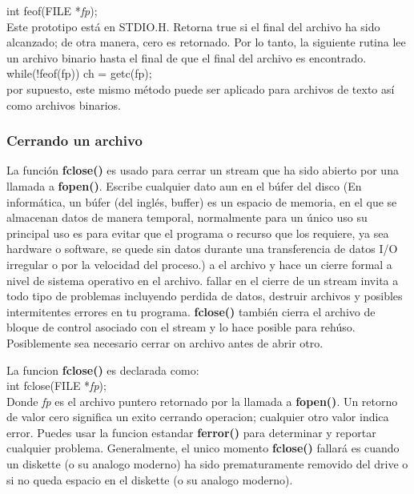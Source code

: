 \documentclass[]{article}
\begin{document}
	int feof(FILE *\textit{fp});\\
	
	Este prototipo está en STDIO.H. Retorna true si el final del archivo ha sido alcanzado; de otra manera, cero es retornado. Por lo tanto, la siguiente rutina lee un archivo binario hasta el final de que el final del archivo es encontrado.\\
	
	while(!feof(fp)) ch = getc(fp);\\
	
	por supuesto, este mismo método puede ser aplicado para archivos de texto así como archivos binarios.
	
	\subsubsection{Cerrando un archivo}
	
	La función \textbf{fclose()} es usado para cerrar un stream que ha sido abierto por una llamada a \textbf{fopen()}. Escribe cualquier dato aun en el búfer del disco (En informática, un búfer (del inglés, buffer) es un espacio de memoria, en el que se almacenan datos de manera temporal, normalmente para un único uso su principal uso es para evitar que el programa o recurso que los requiere, ya sea hardware o software, se quede sin datos durante una transferencia de datos I/O irregular o por la velocidad del proceso.) a el archivo y hace un cierre formal a nivel de sistema operativo en el archivo. fallar en el cierre de un stream invita a todo tipo de problemas incluyendo perdida de datos, destruir archivos y posibles intermitentes errores en tu programa. \textbf{fclose()} también cierra el archivo de bloque de control asociado con el stream y lo hace posible para rehúso. Posiblemente sea necesario cerrar on archivo antes de abrir otro.
	
	La funcion \textbf{fclose()} es declarada como:\\
	
	int fclose(FILE *\textit{fp});\\
	
	Donde \textit{fp} es el archivo puntero retornado por la llamada a \textbf{fopen()}. Un retorno de valor cero significa un exito cerrando operacion; cualquier otro valor indica error. Puedes usar la funcion estandar \textbf{ferror()} para determinar y reportar cualquier problema. Generalmente, el unico momento \textbf{fclose()} fallará es cuando un diskette (o su analogo moderno) ha sido prematuramente removido del drive o si no queda espacio en el diskette (o su analogo moderno).
	
\end{document}
